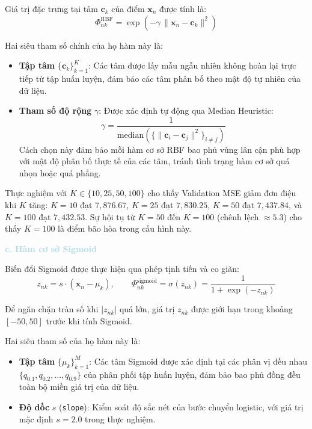 Giá trị đặc trưng tại tâm $\boldsymbol{c}_k$ của điểm $\boldsymbol{x}_n$
được tính là:
$$\Phi_{nk}^{\mathrm{RBF}}
  = \exp\!\left(-\gamma\,\|\boldsymbol{x}_n - \boldsymbol{c}_k\|^2\right)$$

Hai siêu tham số chính của họ hàm này là:
\begin{itemize} [labelsep=10pt, leftmargin=2cm]
    \item \textbf{Tập tâm} $\{\boldsymbol{c}_k\}_{k=1}^{K}$: Các tâm được
    lấy mẫu ngẫu nhiên không hoàn lại trực tiếp từ tập huấn luyện, đảm
    bảo các tâm phân bố theo mật độ tự nhiên của dữ liệu.
    \item \textbf{Tham số độ rộng} $\gamma$: Được xác định tự động qua
    Median Heuristic:
    $$\gamma = \frac{1}{\mathrm{median}\!\left(\{\|\boldsymbol{c}_i
      - \boldsymbol{c}_j\|^2\}_{i \neq j}\right)}$$
    Cách chọn này đảm bảo mỗi hàm cơ sở RBF bao phủ vùng lân cận phù hợp
    với mật độ phân bố thực tế của các tâm, tránh tình trạng hàm cơ sở
    quá nhọn hoặc quá phẳng.
\end{itemize}

Thực nghiệm với $K \in \{10, 25, 50, 100\}$ cho thấy Validation MSE giảm
đơn điệu khi $K$ tăng: $K=10$ đạt $7{,}876.67$, $K=25$ đạt $7{,}830.25$,
$K=50$ đạt $7{,}437.84$, và $K=100$ đạt $7{,}432.53$. Sự hội tụ từ
$K=50$ đến $K=100$ (chênh lệch $\approx 5.3$) cho thấy $K=100$ là
điểm bão hòa trong cấu hình này.

\noindent\textcolor{lightblue}{\textbf{c. Hàm cơ sở Sigmoid}}

Biến đổi Sigmoid được thực hiện qua phép tịnh tiến và co giãn:
$$z_{nk} = s \cdot (\boldsymbol{x}_n - \mu_k), \qquad
  \Phi_{nk}^{\mathrm{sigmoid}} = \sigma(z_{nk})
  = \frac{1}{1 + \exp(-z_{nk})}$$

Để ngăn chặn tràn số khi $|z_{nk}|$ quá lớn, giá trị $z_{nk}$ được
giới hạn trong khoảng $[-50, 50]$ trước khi tính Sigmoid.

Hai siêu tham số của họ hàm này là:
\begin{itemize} [labelsep=10pt, leftmargin=2cm]
    \item \textbf{Tập tâm} $\{\mu_k\}_{k=1}^{M}$: Các tâm Sigmoid được
    xác định tại các phân vị đều nhau $\{q_{0.1}, q_{0.2}, \ldots, q_{0.9}\}$
    của phân phối tập huấn luyện, đảm bảo bao phủ đồng đều toàn bộ miền
    giá trị của dữ liệu.
    \item \textbf{Độ dốc} $s$ (\texttt{slope}): Kiểm soát độ sắc nét của
    bước chuyển logistic, với giá trị mặc định $s = 2.0$ trong thực nghiệm.
\end{itemize}

